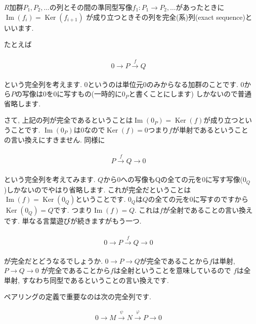 \documentclass{jsarticle}
\newcommand{\makeop}[1]{\mathop{\mathrm{#1}}\nolimits}
\def\Im{\makeop{Im}}
\def\Ker{\makeop{Ker}}
\theoremstyle{definition}
\numberwithin{theorem}{section}
\begin{document}
$R$加群$P_1, P_2, \ldots$の列とその間の準同型写像$f_1: P_1 \rightarrow P_2, \ldots$があったときに$\Im(f_i) = \Ker(f_{i+1})$
が成り立つときその列を完全(系)列(exact sequence)といいます.

たとえば

\begin{eqnarray*}
\begin{aligned}
0 \rightarrow P \xrightarrow{f} Q
\end{aligned}
\end{eqnarray*}

という完全列を考えます. $0$というのは単位元$0$のみからなる加群のことです. $0$から$P$の写像は$0$を$0$に写すもの(一時的に$0_P$と書くことにします)
しかないので普通省略します.

さて, 上記の列が完全であるということは$\Im(0_P) = \Ker(f)$が成り立つということです. $\Im(0_P)$は$0$なので$\Ker(f) = 0$つまり$f$が単射であるということの言い換えにすきません.
同様に

\begin{eqnarray*}
\begin{aligned}
P \xrightarrow{f} Q \rightarrow 0
\end{aligned}
\end{eqnarray*}

という完全列を考えてみます. $Q$から$0$への写像もQの全ての元を$0$に写す写像($0_Q$)しかないのでやはり省略します. これが完全だということは
$\Im(f) = \Ker(0_Q)$ということです. $0_Q$は$Q$の全ての元を$0$に写すのですから$\Ker(0_Q) = Q$です. つまり$\Im(f) = Q$.
これは$f$が全射であることの言い換えです. 単なる言葉遊びが続きますがもう一つ.

\begin{eqnarray*}
\begin{aligned}
0 \rightarrow P \xrightarrow{f} Q \rightarrow 0
\end{aligned}
\end{eqnarray*}

が完全だとどうなるでしょうか. $0 \rightarrow P \rightarrow Q$が完全であることから$f$は単射, $P\rightarrow Q \rightarrow 0$
が完全であることから$f$は全射ということを意味しているので $f$は全単射, すなわち同型であるということの言い換えです.

ペアリングの定義で重要なのは次の完全列です.

\begin{equation}
\label{eq:pairing_exact_seq}
\begin{aligned}
0 \rightarrow M \xrightarrow{\displaystyle\psi} N \xrightarrow{\displaystyle\varphi} P\rightarrow 0
\end{aligned}
\end{equation}
\end{document}
